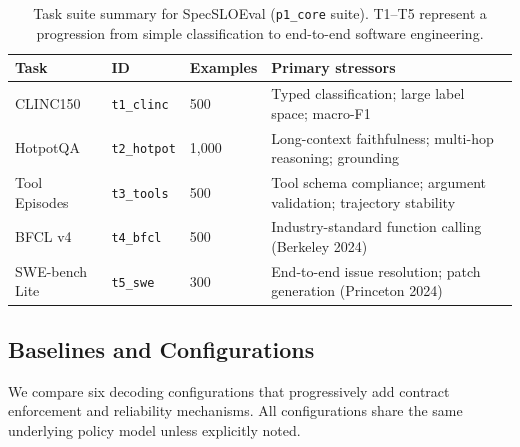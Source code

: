 \documentclass[11pt]{article}
\begin{document}
\begin{table}[t]
\centering
\caption{Task suite summary for SpecSLOEval (\texttt{p1\_core} suite). T1--T5 represent a progression from simple classification to end-to-end software engineering.}
\label{tab:tasks}
\begin{tabularx}{\linewidth}{@{}l l l X@{}}
\toprule
Task & ID & Examples & Primary stressors \\
\midrule
CLINC150 & \texttt{t1\_clinc} & 500 & Typed classification; large label space; macro-F1 \\
HotpotQA & \texttt{t2\_hotpot} & 1{,}000 & Long-context faithfulness; multi-hop reasoning; grounding \\
Tool Episodes & \texttt{t3\_tools} & 500 & Tool schema compliance; argument validation; trajectory stability \\
BFCL v4 & \texttt{t4\_bfcl} & 500 & Industry-standard function calling (Berkeley 2024) \\
SWE-bench Lite & \texttt{t5\_swe} & 300 & End-to-end issue resolution; patch generation (Princeton 2024) \\
\bottomrule
\end{tabularx}
\end{table}


\subsection{Baselines and Configurations}
\label{sec:baselines-configs}

We compare six decoding configurations that progressively add contract enforcement and reliability mechanisms.
All configurations share the same underlying policy model unless explicitly noted.
\end{document}

